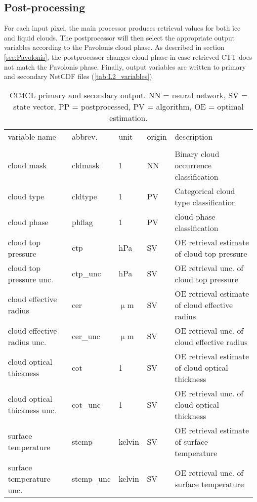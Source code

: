 \subsection{Post-processing}

For each input pixel, the main processor produces retrieval values for both ice and liquid clouds. The postprocessor will then select the appropriate output variables according to the Pavolonis cloud phase. As described in section \ref{sec:Pavolonis}, the postprocessor changes cloud phase in case retrieved CTT does not match the Pavolonis phase. Finally, output variables are written to primary and secondary NetCDF files (\cref{tab:L2_variables}).

\begin{table*}[h]
  \caption{CC4CL primary and secondary output. NN = neural network, SV = state vector, PP = postprocessed, PV = \citet{Pavolonis05} algorithm, OE = optimal estimation.}
  \begin{tabular}{l|l|l|l|l}
    \tophline
    variable name & abbrev. & unit & origin & description \\
    \middlehline
    \multicolumn{5}{c}{primary variables} \\
    \middlehline
    cloud mask & cldmask & 1 & NN & Binary cloud occurrence classification \\
    cloud type & cldtype & 1 & PV & Categorical cloud type classification \\
    cloud phase & phflag & 1 & PV &  cloud phase classification \\
    cloud top pressure & ctp & hPa & SV & OE retrieval estimate of cloud top pressure \\
    cloud top pressure unc. & ctp\_unc & hPa & SV & OE retrieval unc. of cloud top pressure \\
    cloud effective radius & cer & $\upmu$m & SV & OE retrieval estimate of cloud effective radius \\
    cloud effective radius unc. & cer\_unc & $\upmu$m & SV & OE retrieval unc. of cloud effective radius\\
    cloud optical thickness & cot & 1 & SV & OE retrieval estimate of cloud optical thickness \\
    cloud optical thickness unc. & cot\_unc & 1 & SV & OE retrieval unc. of cloud optical thickness \\
    surface temperature & stemp & kelvin & SV & OE retrieval estimate of surface temperature \\
    surface temperature unc. & stemp\_unc & kelvin & SV & OE retrieval unc. of surface temperature\\

\end{tabular}
\end{table*}
